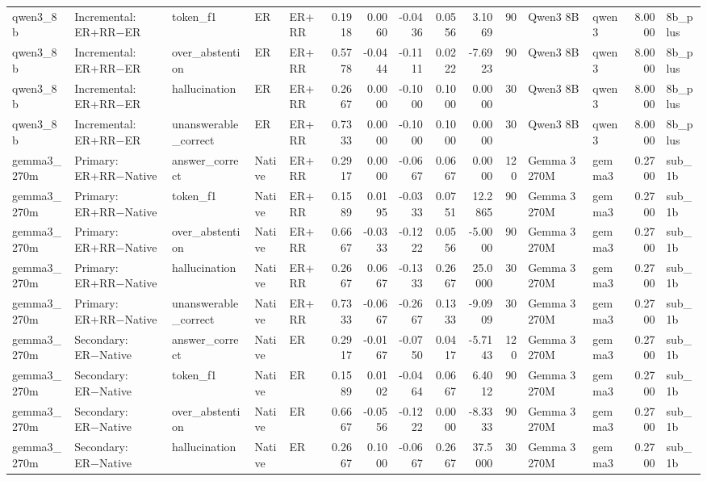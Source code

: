 \begin{tabular}{lllllrrrrrrllrl}
qwen3_8b & Incremental: ER+RR−ER & token_f1 & ER & ER+RR & 0.1918 & 0.0060 & -0.0436 & 0.0556 & 3.1069 & 90 & Qwen3 8B & qwen3 & 8.0000 & 8b_plus \\
qwen3_8b & Incremental: ER+RR−ER & over_abstention & ER & ER+RR & 0.5778 & -0.0444 & -0.1111 & 0.0222 & -7.6923 & 90 & Qwen3 8B & qwen3 & 8.0000 & 8b_plus \\
qwen3_8b & Incremental: ER+RR−ER & hallucination & ER & ER+RR & 0.2667 & 0.0000 & -0.1000 & 0.1000 & 0.0000 & 30 & Qwen3 8B & qwen3 & 8.0000 & 8b_plus \\
qwen3_8b & Incremental: ER+RR−ER & unanswerable_correct & ER & ER+RR & 0.7333 & 0.0000 & -0.1000 & 0.1000 & 0.0000 & 30 & Qwen3 8B & qwen3 & 8.0000 & 8b_plus \\
gemma3_270m & Primary: ER+RR−Native & answer_correct & Native & ER+RR & 0.2917 & 0.0000 & -0.0667 & 0.0667 & 0.0000 & 120 & Gemma 3 270M & gemma3 & 0.2700 & sub_1b \\
gemma3_270m & Primary: ER+RR−Native & token_f1 & Native & ER+RR & 0.1589 & 0.0195 & -0.0333 & 0.0751 & 12.2865 & 90 & Gemma 3 270M & gemma3 & 0.2700 & sub_1b \\
gemma3_270m & Primary: ER+RR−Native & over_abstention & Native & ER+RR & 0.6667 & -0.0333 & -0.1222 & 0.0556 & -5.0000 & 90 & Gemma 3 270M & gemma3 & 0.2700 & sub_1b \\
gemma3_270m & Primary: ER+RR−Native & hallucination & Native & ER+RR & 0.2667 & 0.0667 & -0.1333 & 0.2667 & 25.0000 & 30 & Gemma 3 270M & gemma3 & 0.2700 & sub_1b \\
gemma3_270m & Primary: ER+RR−Native & unanswerable_correct & Native & ER+RR & 0.7333 & -0.0667 & -0.2667 & 0.1333 & -9.0909 & 30 & Gemma 3 270M & gemma3 & 0.2700 & sub_1b \\
gemma3_270m & Secondary: ER−Native & answer_correct & Native & ER & 0.2917 & -0.0167 & -0.0750 & 0.0417 & -5.7143 & 120 & Gemma 3 270M & gemma3 & 0.2700 & sub_1b \\
gemma3_270m & Secondary: ER−Native & token_f1 & Native & ER & 0.1589 & 0.0102 & -0.0464 & 0.0667 & 6.4012 & 90 & Gemma 3 270M & gemma3 & 0.2700 & sub_1b \\
gemma3_270m & Secondary: ER−Native & over_abstention & Native & ER & 0.6667 & -0.0556 & -0.1222 & 0.0000 & -8.3333 & 90 & Gemma 3 270M & gemma3 & 0.2700 & sub_1b \\
gemma3_270m & Secondary: ER−Native & hallucination & Native & ER & 0.2667 & 0.1000 & -0.0667 & 0.2667 & 37.5000 & 30 & Gemma 3 270M & gemma3 & 0.2700 & sub_1b \\

\end{tabular}
